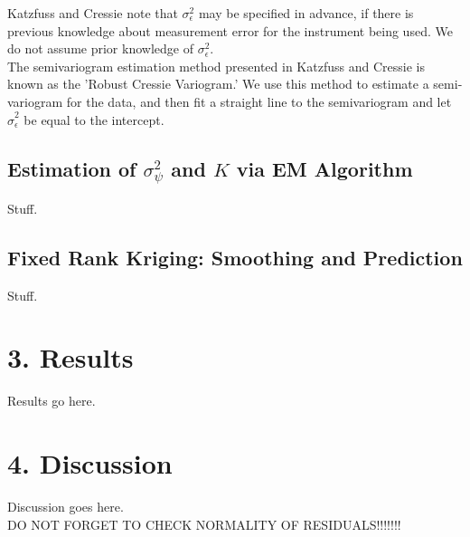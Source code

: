 \documentclass[11pt]{article}
\begin{document}
Katzfuss and Cressie note that $\sigma^2_\epsilon$ may be specified in advance, if there is previous knowledge about measurement error for the instrument being used.  We do not assume prior knowledge of $\sigma^2_\epsilon$. \\

The semivariogram estimation method presented in Katzfuss and Cressie is known as the 'Robust Cressie Variogram.'  We use this method to estimate a semi-variogram for the data, and then fit a straight line to the semivariogram and let $\hat{\sigma}^2_\epsilon$ be equal to the intercept.







\subsection{Estimation of $\sigma^2_{\psi}$ and $K$ via EM Algorithm}

Stuff.\\

\subsection{Fixed Rank Kriging: Smoothing and Prediction}

Stuff.\\


\newpage
\section{3. Results}

Results go here. \\

\newpage
\section{4. Discussion}

Discussion goes here. \\

DO NOT FORGET TO CHECK NORMALITY OF RESIDUALS!!!!!!!\\
\end{document}
